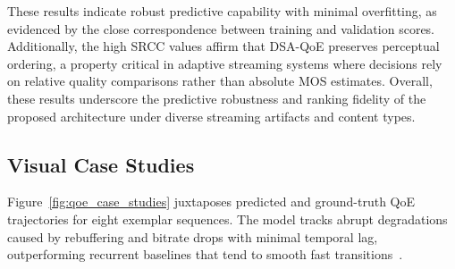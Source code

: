 These results indicate robust predictive capability with minimal overfitting, as evidenced by the close correspondence between training and validation scores. 
Additionally, the high SRCC values affirm that DSA-QoE preserves perceptual ordering, a property critical in adaptive streaming systems where decisions rely on 
relative quality comparisons rather than absolute MOS estimates. Overall, these results underscore the predictive robustness and ranking fidelity of the proposed 
architecture under diverse streaming artifacts and content types.

\subsection{Visual Case Studies}
\label{sec:visual_case_studies}

Figure~\ref{fig:qoe_case_studies} juxtaposes predicted and ground-truth QoE trajectories for eight exemplar sequences.  
The model tracks abrupt degradations caused by rebuffering and bitrate drops with minimal temporal lag, outperforming recurrent baselines that tend to smooth fast transitions~\cite{jia2024continuous}.  

